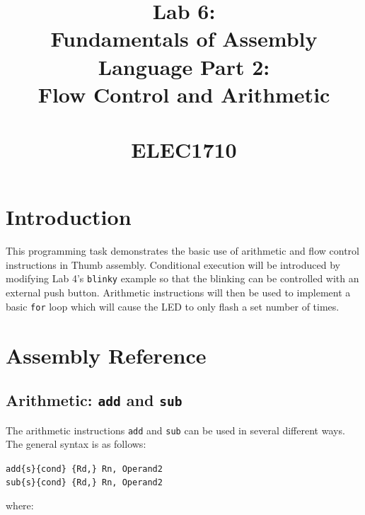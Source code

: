 \documentclass{UoNMCHA}
\numberwithin{equation}{section}
\begin{document}
\title{Lab 6:\\Fundamentals of Assembly Language Part 2: \\ Flow Control and Arithmetic \\ \ \\
{\small ELEC1710   \\ 
}}
\maketitle
\onecolumn

\vspace{-5mm}

\section{Introduction}

This programming task demonstrates the basic use of arithmetic and flow control instructions in Thumb assembly. Conditional execution will be introduced by modifying Lab 4's \texttt{blinky} example so that the blinking can be controlled with an external push button. Arithmetic instructions will then be used to implement a basic \texttt{for} loop which will cause the LED to only flash a set number of times.

\section{Assembly Reference}

\subsection{Arithmetic: \texttt{add} and \texttt{sub}}

The arithmetic instructions \texttt{add} and \texttt{sub} can be used in several different ways. The general syntax is as follows:

\texttt{add\{s\}\{cond\} \{Rd,\} Rn, Operand2} \\
\texttt{sub\{s\}\{cond\} \{Rd,\} Rn, Operand2}

where:
\end{document}
